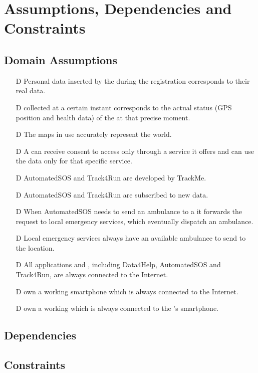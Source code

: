 \documentclass[../../rasd.tex]{subfiles}
\begin{document}
\section{Assumptions, Dependencies and Constraints}
		\subsection{Domain Assumptions}
			 	\begin{itemize}
				 	\item[D\subs{1}]Personal data inserted by the  during the registration corresponds to their real data.
					\item[D\subs{2}] collected at a certain instant corresponds to the actual status (GPS position and health data) of the  at that precise moment.				
					\item[D\subs{4}]The maps in use accurately represent the world.
					\item[D\subs{5}]A  can receive consent to  access only through a service it offers and can use the data only for that specific service.
					\item[D\subs{6}]AutomatedSOS and Track4Run are  developed by TrackMe.
					\item[D\subs{7}]AutomatedSOS and Track4Run are subscribed to new data.
					\item[D\subs{8}]When AutomatedSOS needs to send an ambulance to a  it forwards the request to local emergency services, which eventually dispatch an ambulance.
					\item[D\subs{9}]Local emergency services always have an available ambulance to send to the  location.
					\item[D\subs{10}]All applications and , including Data4Help, AutomatedSOS and Track4Run, are always connected to the Internet.
					\item[D\subs{11}] own a working smartphone which is always connected to the Internet.
					\item[D\subs{12}] own a working  which is always connected to the 's smartphone.
				\end{itemize}	
		\subsection{Dependencies}
		\subsection{Constraints}
\end{document}

